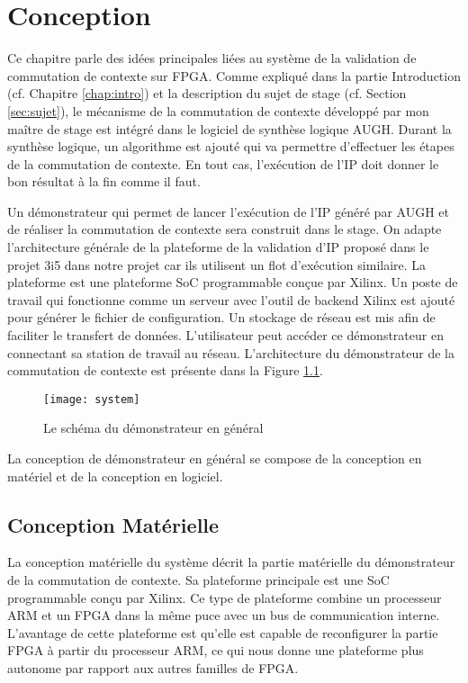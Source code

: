 \chapter{Conception}
\label{chap:concep}
\OnehalfSpacing

Ce chapitre parle des idées principales liées au système de la validation de commutation de contexte sur FPGA.
Comme expliqué dans la partie Introduction (cf. Chapitre \ref{chap:intro}) et la description du sujet de stage 
(cf. Section \ref{sec:sujet}), le mécanisme de la commutation de contexte développé par mon maître de stage
est intégré dans le logiciel de synthèse logique AUGH. Durant la synthèse logique, un algorithme est ajouté
qui va permettre d'effectuer les étapes de la commutation de contexte. En tout cas, l'exécution de l'IP
doit donner le bon résultat à la fin comme il faut.

Un démonstrateur qui permet de lancer l'exécution de l'IP généré par AUGH et de réaliser la commutation
de contexte sera construit dans le stage.
On adapte l'architecture générale de la plateforme de la validation d'IP
proposé dans le projet 3i5\cite{Brisebard2015, Wicaksana2015} dans notre projet car ils utilisent
un flot d'exécution similaire. La plateforme est une plateforme SoC programmable conçue par Xilinx.
Un poste de travail qui fonctionne comme un serveur avec l'outil de backend Xilinx est ajouté pour générer le fichier de configuration. 
Un stockage de réseau est mis afin de faciliter le transfert de données.
L'utilisateur peut accéder ce démonstrateur en connectant sa station de travail au réseau.
L'architecture du démonstrateur de la commutation de contexte est présente dans la Figure \ref{fig:system}.

\begin{figure}[h]
	\centering
	\texttt{[image: system]}
	\caption{Le schéma du démonstrateur en général}
	\label{fig:system}
	\vspace{-2mm}
\end{figure} 

La conception de démonstrateur en général se compose de la conception en matériel et
de la conception en logiciel.

\section{Conception Matérielle}
\label{sec:concephard}

La conception matérielle du système décrit la partie matérielle du démonstrateur de la commutation de contexte.
Sa plateforme principale est une SoC programmable conçu par Xilinx. Ce type de plateforme
combine un processeur ARM et un FPGA dans la même puce avec un bus de communication interne. L'avantage de cette plateforme
est qu'elle est capable de reconfigurer la partie FPGA à partir du processeur ARM, ce qui nous donne une plateforme plus autonome
par rapport aux autres familles de FPGA.

